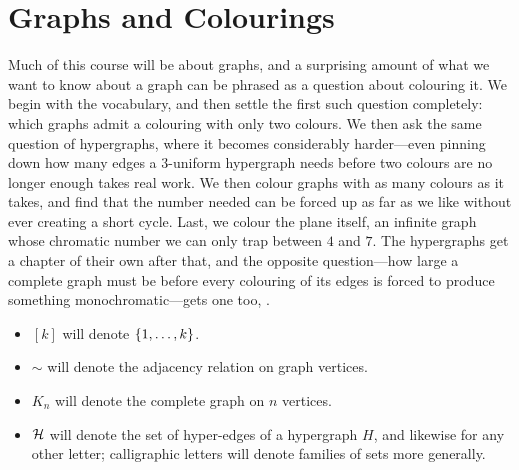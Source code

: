 
\chapter{Graphs and Colourings} \label{Ch2:CH}
\thispagestyle{empty}

Much of this course will be about graphs, and a surprising amount of what we want to know about a graph can be phrased as a question about colouring it. We begin with the vocabulary, and then settle the first such question completely: which graphs admit a colouring with only two colours. We then ask the same question of hypergraphs, where it becomes considerably harder---even pinning down how many edges a $3$-uniform hypergraph needs before two colours are no longer enough takes real work. We then colour graphs with as many colours as it takes, and find that the number needed can be forced up as far as we like without ever creating a short cycle. Last, we colour the plane itself, an infinite graph whose chromatic number we can only trap between $4$ and $7$. The hypergraphs get a chapter of their own after that, and the opposite question---how large a complete graph must be before every colouring of its edges is forced to produce something monochromatic---gets one too, .

\begin{boxnotation} \hfill
    \begin{itemize}
        \item $[k]$ will denote $\left\{ 1, \ldots, k \right\}$.
        \item $\sim$ will denote the adjacency relation on graph vertices.
        \item $K_n$ will denote the complete graph on $n$ vertices.
        \item $\mathcal{H}$ will denote the set of hyper-edges of a hypergraph $H$, and likewise for any other letter; calligraphic letters will denote families of sets more generally.
    \end{itemize}
\end{boxnotation}




